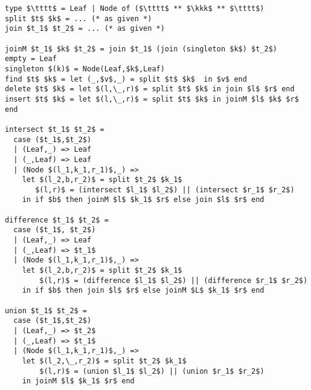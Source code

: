 \begin{datastructure}
\label{ds:bst::parametric}
\begin{lstlisting}
type $\tttt$ = Leaf | Node of ($\tttt$ ** $\kkk$ ** $\tttt$)
split $t$ $k$ = ... (* as given *)
join $t_1$ $t_2$ = ... (* as given *)

joinM $t_1$ $k$ $t_2$ = join $t_1$ (join (singleton $k$) $t_2$)
empty = Leaf
singleton $(k)$ = Node(Leaf,$k$,Leaf)  
find $t$ $k$ = let (_,$v$,_) = split $t$ $k$  in $v$ end 
delete $t$ $k$ = let $(l,\_,r)$ = split $t$ $k$ in join $l$ $r$ end
insert $t$ $k$ = let $(l,\_,r)$ = split $t$ $k$ in joinM $l$ $k$ $r$ end 

intersect $t_1$ $t_2$ =
  case ($t_1$,$t_2$) 
  | (Leaf,_) => Leaf
  | (_,Leaf) => Leaf
  | (Node $(l_1,k_1,r_1)$,_) => 
    let $(l_2,b,r_2)$ = split $t_2$ $k_1$
       $(l,r)$ = (intersect $l_1$ $l_2$) || (intersect $r_1$ $r_2$)
    in if $b$ then joinM $l$ $k_1$ $r$ else join $l$ $r$ end

difference $t_1$ $t_2$ =
  case ($t_1$, $t_2$)
  | (Leaf,_) => Leaf
  | (_,Leaf) => $t_1$
  | (Node $(l_1,k_1,r_1)$,_) => 
    let $(l_2,b,r_2)$ = split $t_2$ $k_1$
        $(l,r)$ = (difference $l_1$ $l_2$) || (difference $r_1$ $r_2$)
    in if $b$ then join $l$ $r$ else joinM $L$ $k_1$ $r$ end

union $t_1$ $t_2$ =
  case ($t_1$,$t_2$)
  | (Leaf,_) => $t_2$
  | (_,Leaf) => $t_1$
  | (Node $(l_1,k_1,r_1)$,_) =>   
    let $(l_2,\_,r_2)$ = split $t_2$ $k_1$
        $(l,r)$ = (union $l_1$ $l_2$) || (union $r_1$ $r_2$)
    in joinM $l$ $k_1$ $r$ end    
\end{lstlisting}
\end{datastructure}

